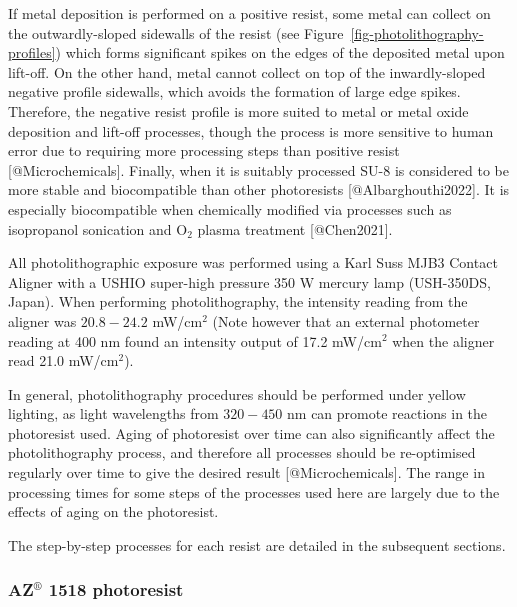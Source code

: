 \documentclass[
  letterpaper,
  DIV=11,
  numbers=noendperiod]{scrartcl}
\begin{document}
If metal deposition is performed on a positive resist, some metal can
collect on the outwardly-sloped sidewalls of the resist (see
Figure~\ref{fig-photolithography-profiles}) which forms significant
spikes on the edges of the deposited metal upon lift-off. On the other
hand, metal cannot collect on top of the inwardly-sloped negative
profile sidewalls, which avoids the formation of large edge spikes.
Therefore, the negative resist profile is more suited to metal or metal
oxide deposition and lift-off processes, though the process is more
sensitive to human error due to requiring more processing steps than
positive resist {[}@Microchemicals{]}. Finally, when it is suitably
processed SU-8 is considered to be more stable and biocompatible than
other photoresists {[}@Albarghouthi2022{]}. It is especially
biocompatible when chemically modified via processes such as isopropanol
sonication and O\(_2\) plasma treatment {[}@Chen2021{]}.

All photolithographic exposure was performed using a Karl Suss MJB3
Contact Aligner with a USHIO super-high pressure 350 W mercury lamp
(USH-350DS, Japan). When performing photolithography, the intensity
reading from the aligner was \(20.8-24.2\) mW/cm\(^2\) (Note however
that an external photometer reading at 400 nm found an intensity output
of 17.2 mW/cm\(^2\) when the aligner read 21.0 mW/cm\(^2\)).

In general, photolithography procedures should be performed under yellow
lighting, as light wavelengths from \(320-450\) nm can promote reactions
in the photoresist used. Aging of photoresist over time can also
significantly affect the photolithography process, and therefore all
processes should be re-optimised regularly over time to give the desired
result {[}@Microchemicals{]}. The range in processing times for some
steps of the processes used here are largely due to the effects of aging
on the photoresist.

The step-by-step processes for each resist are detailed in the
subsequent sections.

\hypertarget{azcircledr-1518-photoresist}{%
\subsubsection{\texorpdfstring{AZ\(^\circledR\) 1518
photoresist}{AZ\^{}\textbackslash circledR 1518 photoresist}}\label{azcircledr-1518-photoresist}}
\end{document}
